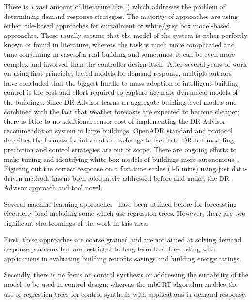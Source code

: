 There is a vast amount of literature like (\cite{oldewurtel2013towards,xu2004peak}) which addresses the problem of determining demand response strategies. 
The majority of approaches are using either rule-based approaches for curtailment or white/grey box model-based approaches.
These usually assume that the model of the system is either perfectly known or found in literature, whereas the task is much more complicated and time consuming in case of a real building and sometimes, it can be even more complex and involved than the controller design itself.
After several years of work on using first principles based models for demand response, multiple authors~\cite{costmpc,reallife} have concluded that the biggest hurdle to mass adoption of intelligent building control is the cost and effort required to capture accurate dynamical models of the buildings.
Since DR-Advisor learns an aggregate building level models and combined with the fact that weather forecasts are expected to become cheaper; there is little to no additional sensor cost of implementing the DR-Advisor recommendation system in large buildings. OpenADR standard and protocol~\cite{openadr} describes the formats for information exchange to facilitate DR but modeling, prediction and control strategies are out of scope.
There are ongoing efforts to make tuning and identifying white box models of buildings more autonomous~\cite{new2012autotune}.
Figuring out the correct response on a fast time scales (1-5 mins) using just data-driven methods has'nt been adequately addressed before and makes the DR-Advisor approach and tool novel.

Several machine learning approaches~\cite{edwards2012predicting,vaghefi2014modeling,yin2012scalable} have been utilized before for forecasting electricity load including some which use regression trees. 
However, there are two significant shortcomings of the work in this area: 
\begin{inparaenum}[(a)]
\item First, these approaches are coarse grained and  are not aimed at solving demand response problems but are restricted to long term load forecasting with applications in evaluating building retrofits savings and building energy ratings. 
\item Secondly, there is no focus on control synthesis or addressing the suitability of the model to be used in control design; whereas the mbCRT algorithm enables the use of regression trees for control synthesis with applications in demand response. 
\end{inparaenum}